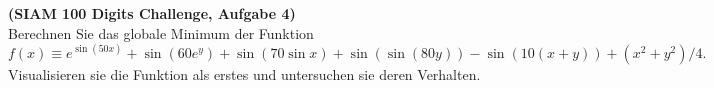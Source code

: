 \begin{aufg}[0]
  \textbf{(SIAM 100 Digits Challenge, Aufgabe 4)}\\
Berechnen Sie das globale Minimum der Funktion
\[
   f(x)\equiv e^{\sin(50 x)} + \sin(60 e^y) + \sin(70\sin x) + \sin(\sin(80 y)) - \sin(10(x+y))+(x^2+y^2)/4.
\]
Visualisieren sie die Funktion als erstes und untersuchen sie deren Verhalten.
\end{aufg}

